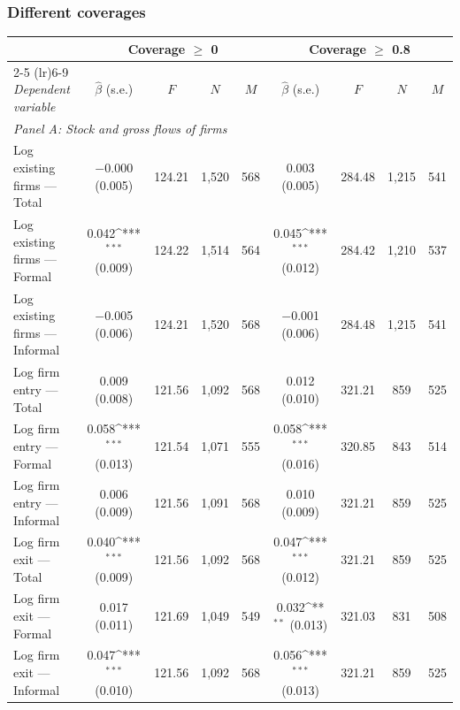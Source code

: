 \documentclass[aspectratio=169]{beamer}
\newcommand{\sym}[1]{\ifmmode^{#1}\else\(^{#1}\)\fi}
\begin{document}
\begin{frame}[noframenumbering]
\frametitle{\textbf{Different coverages}} \label{coverage}
\begin{center}
    \tiny
    \begin{tabular}{lcccccccc}
        \toprule
        & \multicolumn{4}{c}{\textbf{Coverage $\geq$ 0}}
        & \multicolumn{4}{c}{\textbf{Coverage $\geq$ 0.8}} \\
        \cmidrule(lr){2-5} \cmidrule(lr){6-9}
        \textit{Dependent variable}
        & $\hat\beta$ (s.e.) & $F$ & $N$ & $M$
        & $\hat\beta$ (s.e.) & $F$ & $N$ & $M$ \\
        \midrule
        \multicolumn{9}{l}{\textit{Panel A: Stock and gross flows of firms}} \\
        Log existing firms --- Total
        & $-$0.000 (0.005) & 124.21 & 1{,}520 & 568
        & 0.003 (0.005) & 284.48 & 1{,}215 & 541 \\
        Log existing firms --- Formal
        & 0.042\sym{***} (0.009) & 124.22 & 1{,}514 & 564
        & 0.045\sym{***} (0.012) & 284.42 & 1{,}210 & 537 \\
        Log existing firms --- Informal
        & $-$0.005 (0.006) & 124.21 & 1{,}520 & 568
        & $-$0.001 (0.006) & 284.48 & 1{,}215 & 541 \\
        Log firm entry --- Total
        & 0.009 (0.008) & 121.56 & 1{,}092 & 568
        & 0.012 (0.010) & 321.21 & \phantom{1{,}}859 & 525 \\
        Log firm entry --- Formal
        & 0.058\sym{***} (0.013) & 121.54 & 1{,}071 & 555
        & 0.058\sym{***} (0.016) & 320.85 & \phantom{1{,}}843 & 514 \\
        Log firm entry --- Informal
        & 0.006 (0.009) & 121.56 & 1{,}091 & 568
        & 0.010 (0.009) & 321.21 & \phantom{1{,}}859 & 525 \\
        Log firm exit --- Total
        & 0.040\sym{***} (0.009) & 121.56 & 1{,}092 & 568
        & 0.047\sym{***} (0.012) & 321.21 & \phantom{1{,}}859 & 525 \\
        Log firm exit --- Formal
        & 0.017 (0.011) & 121.69 & 1{,}049 & 549
        & 0.032\sym{**} (0.013) & 321.03 & \phantom{1{,}}831 & 508 \\
        Log firm exit --- Informal
        & 0.047\sym{***} (0.010) & 121.56 & 1{,}092 & 568
        & 0.056\sym{***} (0.013) & 321.21 & \phantom{1{,}}859 & 525 \\
        \midrule

\end{tabular}
\end{center}
\end{frame}
\end{document}
